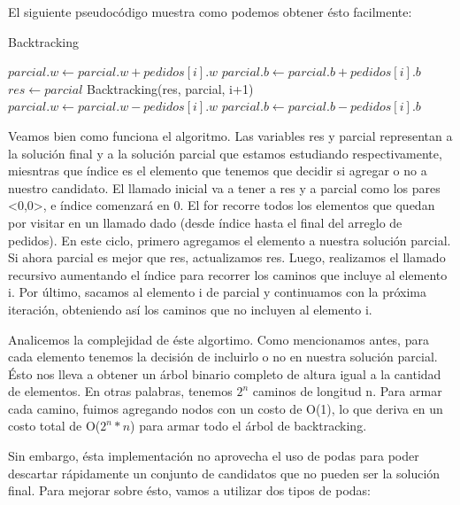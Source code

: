 El siguiente pseudocódigo muestra como podemos obtener ésto facilmente:

\begin{algorithm}
\caption{Backtracking}\label{selection}
\begin{algorithmic}[1]
   	\State $parcial.w \gets parcial.w + pedidos[i].w$
	  \State $parcial.b \gets parcial.b + pedidos[i].b$
    \State $res \gets parcial$
    \EndIf
    \State Backtracking(res, parcial, i+1)
    \State $parcial.w \gets parcial.w - pedidos[i].w$
	  \State $parcial.b \gets parcial.b - pedidos[i].b$

	 \EndFor
\EndProcedure
\end{algorithmic}
\end{algorithm}

Veamos bien como funciona el algoritmo. Las variables res y parcial representan a la solución final y a la solución parcial que estamos estudiando respectivamente, miesntras que índice es el elemento que tenemos que decidir si agregar o no a nuestro candidato. El llamado inicial va a tener a res y a parcial como los pares <0,0>, e índice comenzará en 0. El for recorre todos los elementos que quedan por visitar en un llamado dado (desde índice hasta el final del arreglo de pedidos). En este  ciclo, primero agregamos el elemento a nuestra solución parcial. Si ahora parcial es mejor que res, actualizamos res. Luego, realizamos el llamado recursivo aumentando el índice para recorrer los caminos que incluye al elemento i. Por último, sacamos al elemento i de parcial y continuamos con la próxima iteración, obteniendo así los caminos que no incluyen al elemento i.


Analicemos la complejidad de éste algortimo. Como mencionamos antes, para cada elemento tenemos la decisión de incluirlo o no en nuestra solución parcial. Ésto nos lleva a obtener un árbol binario completo de altura igual a la cantidad de elementos. En otras palabras, tenemos $2^{n}$ caminos de longitud n. Para armar cada camino, fuimos agregando nodos con un costo de O(1), lo que deriva en un costo total de O($2^{n} * n$) para armar todo el árbol de backtracking.

Sin embargo, ésta implementación no aprovecha el uso de podas para poder descartar rápidamente un conjunto de candidatos que no pueden ser la solución final. Para mejorar sobre ésto, vamos a utilizar dos tipos de podas:

